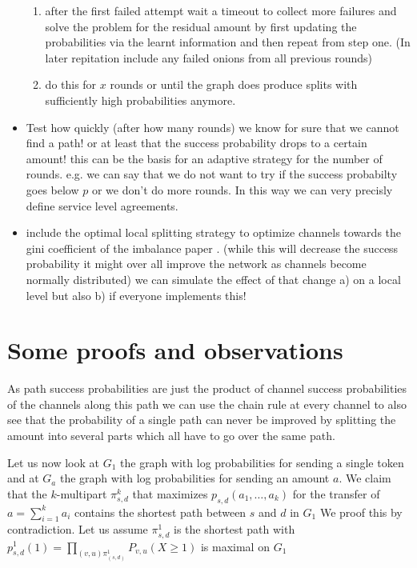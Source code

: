 \documentclass[10pt,twocolumn]{article}
\begin{document}
\begin{itemize}
\begin{enumerate}
  \item after the first failed attempt wait a timeout to collect more failures and solve the problem for the residual amount by first updating the probabilities via the learnt information and then repeat from step one. (In later repitation include any failed onions from all previous rounds)
  \item do this for $x$ rounds or until the graph does produce splits with sufficiently high probabilities anymore. 
  \end{enumerate}
\item Test how quickly (after how many rounds) we know for sure that we cannot find a path! or at least that the success probability drops to a certain amount! this can be the basis for an adaptive strategy for the number of rounds. e.g. we can say that we do not want to try if the success probabilty goes below $p$ or we don't do more rounds. In this way we can very precisly define service level agreements.
  \item include the optimal local splitting strategy to optimize channels towards the gini coefficient of the imbalance paper \cite{Pickhardt2019}. (while this will decrease the success probability it might over all improve the network as channels become normally distributed) we can simulate the effect of that change a) on a local level but also b) if everyone implements this!
\end{itemize}

\section{Some proofs and observations}

As path success probabilities are just the product of channel success probabilities of the channels along this path we can use the chain rule at every channel to also see that the probability of a single path can never be improved by splitting the amount into several parts which all have to go over the same path.

Let us now look at $G_1$ the graph with log probabilities for sending a single token and at $G_a$ the graph with log probabilities for sending an amount $a$.
We claim that the $k$-multipart $\pi_{s,d}^k$ that maximizes $p_{s,d}(a_1,\dots,a_k)$ for the transfer of $a=\sum_{i=1}^ka_i$ contains the shortest path between $s$ and $d$ in $G_1$
We proof this by contradiction.
Let us assume $\pi_{s,d}^1$ is the shortest path with $p_{s,d}^1(1)=\prod_{(v,u)\pi_(s,d)^1}P_{v,u}(X \geq 1)$ is maximal on $G_1$
\end{document}

